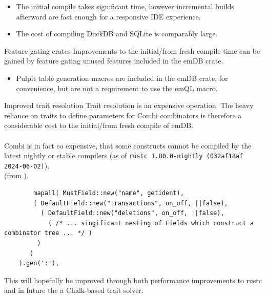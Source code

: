 \begin{itemize}
    \setlength\itemsep{0em}
    \item The initial compile takes significant time, however incremental builds afterward are fast enough for a responsive IDE experience.
    \item The cost of compiling DuckDB and SQLite is comparably large.
\end{itemize}
\begin{futurebox}{Feature gating crates}
    Improvements to the initial/from fresh compile time can be gained by feature gating unused features included in the emDB crate.
    \begin{itemize}
        \item Pulpit table generation macros are included in the emDB crate, for convenience, but are not a requirement to use the emQL macro.
    \end{itemize}
\end{futurebox}
\newpage
\begin{futurebox}{Improved trait resolution}
    Trait resolution\cite{TraitSolving} is an expensive operation. The heavy reliance on traits to define parameters for Combi combinators 
    is therefore a considerable cost to the initial/from fresh compile of emDB.
    \\
    \\ Combi is in fact so expensive, that some constructs cannot be compiled by the latest nightly or stable compilers (as of \texttt{rustc 1.80.0-nightly (032af18af 2024-06-02)}).
    \\ (from ).
    \begin{verbatim}
        mapall( MustField::new("name", getident),
        ( DefaultField::new("transactions", on_off, ||false),
          ( DefaultField::new("deletions", on_off, ||false),
            ( /* ... singificant nesting of Fields which construct a combinator tree ... */ )
         )
       )
    ).gen(':'),
    \end{verbatim}
    This will hopefully be improved through both performance improvements to rustc and in future the a Chalk-based trait solver.\cite{ChalktraitSolver}
\end{futurebox}

